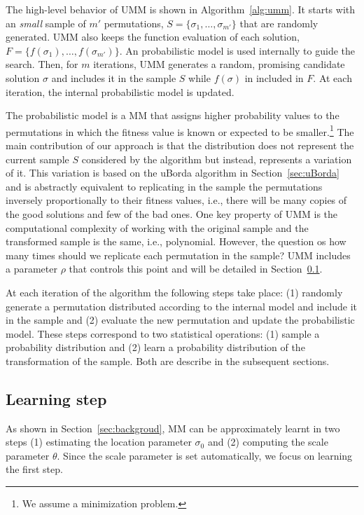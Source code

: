 \documentclass[runningheads]{llncs}
\begin{document}
The high-level behavior of UMM is shown in Algorithm~\ref{alg:umm}. It starts with an \textit{small} sample of $m'$ permutations, $S=\{\sigma_1, \ldots,  \sigma_{m'}\}$ that are randomly generated. UMM also keeps the function evaluation of each solution, $F=\{f(\sigma_1), \ldots, f(\sigma_{m'})\}$. An probabilistic model is used internally to guide the search. Then, for $m$ iterations, UMM generates a random, promising candidate solution $\sigma$ and includes it in the sample $S$ while $f(\sigma)$ in included in $F$. At each iteration, the internal probabilistic model is updated. 

The probabilistic model is a MM that assigns higher probability values to the permutations in which the fitness value is known or expected to be smaller.\footnote{We assume a minimization problem.} The main contribution of our approach is that the distribution does not represent the current sample $S$ considered by the algorithm but instead, represents a variation of it. This variation is based on the uBorda algorithm in Section~\ref{sec:uBorda} and is abstractly equivalent to replicating in the sample the permutations inversely proportionally to their fitness values, i.e., there will be many copies of the good solutions and few of the bad ones. One key property of UMM is the computational complexity of working with the original sample and the transformed sample is the same, i.e., polynomial. However, the question os how many times should we replicate each permutation in the sample? UMM includes a parameter $\rho$ that controls this point and will be detailed in Section~\ref{sec:learning}.

At each iteration of the algorithm the following steps take place: (1) randomly generate a permutation distributed according to the internal model and include it in the sample and (2) evaluate the new permutation and update the probabilistic model. These steps correspond to two statistical operations: (1) sample a probability distribution and (2) learn a probability distribution of the transformation of the sample. Both are describe in the subsequent sections. 

\subsection{Learning step}\label{sec:learning}

As shown in Section~\ref{sec:backgroud}, MM can be approximately learnt in two steps (1) estimating the location parameter $\sigma_0$ and (2) computing the scale parameter $\theta$. Since the scale parameter is set automatically, we focus on learning the first step. 
\end{document}
